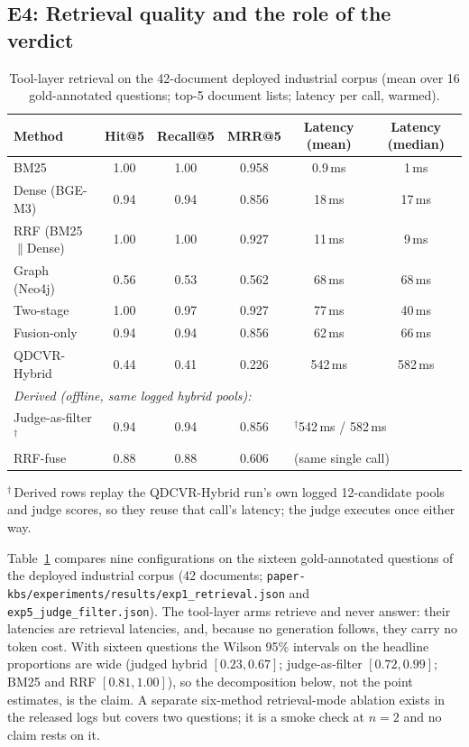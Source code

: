 \subsection{E4: Retrieval quality and the role of the verdict}
\label{sec:e4}
\label{sec:eval-retrieval}

\begin{table}[!htbp]
\centering
\small
\setlength{\tabcolsep}{3pt}
\caption{Tool-layer retrieval on the 42-document deployed industrial corpus
(mean over 16 gold-annotated questions; top-5 document lists; latency per
call, warmed).}
\label{tab:retrieval}
\begin{tabular}{lccccc}
\toprule
Method & Hit@5 & Recall@5 & MRR@5 & Latency (mean) & Latency (median) \\
\midrule
BM25                  & 1.00 & 1.00 & 0.958 & 0.9\,ms    & 1\,ms \\
Dense (BGE-M3)        & 0.94 & 0.94 & 0.856 & 18\,ms     & 17\,ms \\
RRF (BM25$\|$Dense)   & 1.00 & 1.00 & 0.927 & 11\,ms     & 9\,ms \\
Graph (Neo4j)         & 0.56 & 0.53 & 0.562 & 68\,ms     & 68\,ms \\
Two-stage             & 1.00 & 0.97 & 0.927 & 77\,ms     & 40\,ms \\
Fusion-only           & 0.94 & 0.94 & 0.856 & 62\,ms     & 66\,ms \\
QDCVR-Hybrid          & 0.44 & 0.41 & 0.226 & 542\,ms    & 582\,ms \\
\midrule
\multicolumn{6}{l}{\emph{Derived (offline, same logged hybrid pools):}}\\
\quad Judge-as-filter$^{\dagger}$ & 0.94 & 0.94 & 0.856 & \multicolumn{2}{l}{$^{\dagger}$542\,ms / 582\,ms} \\
\quad RRF-fuse & 0.88 & 0.88 & 0.606 & \multicolumn{2}{l}{(same single call)} \\
\bottomrule
\end{tabular}
\par\smallskip
\raggedright\small
$^{\dagger}$\,Derived rows replay the QDCVR-Hybrid run's own logged
12-candidate pools and judge scores, so they reuse that call's latency; the
judge executes once either way.
\end{table}

Table~\ref{tab:retrieval} compares nine configurations on the sixteen
gold-annotated questions of the deployed industrial corpus (42 documents;
\texttt{paper-kbs/experiments/results/exp1\_retrieval.json} and
\texttt{exp5\_judge\_filter.json}). The tool-layer arms retrieve and never
answer: their latencies are retrieval latencies, and, because no generation
follows, they carry no token cost. With sixteen questions the Wilson 95\%
intervals on the headline proportions are wide (judged hybrid $[0.23, 0.67]$;
judge-as-filter $[0.72, 0.99]$; BM25 and RRF $[0.81, 1.00]$), so the
decomposition below, not the point estimates, is the claim. A separate
six-method retrieval-mode ablation exists in the released logs but covers two
questions; it is a smoke check at $n = 2$ and no claim rests on it.

